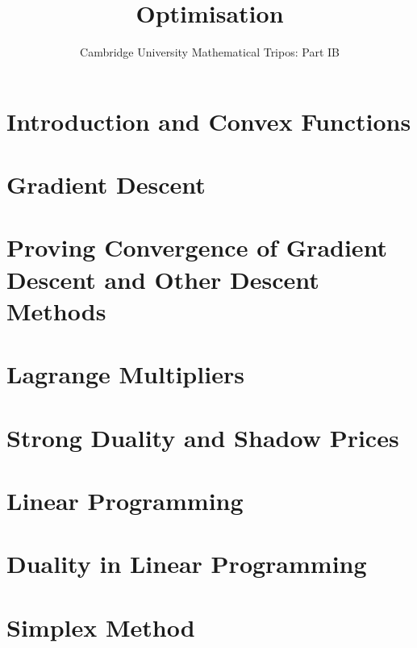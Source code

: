 \documentclass{article}
\title{Optimisation}
\author{Cambridge University Mathematical Tripos: Part IB}
\begin{document}
\maketitle

\tableofcontentsnewpage{}

\section{Introduction and Convex Functions}

\section{Gradient Descent}

\section{Proving Convergence of Gradient Descent and Other Descent Methods}

\section{Lagrange Multipliers}

\section{Strong Duality and Shadow Prices}

\section{Linear Programming}

\section{Duality in Linear Programming}

\section{Simplex Method}

\end{document}
